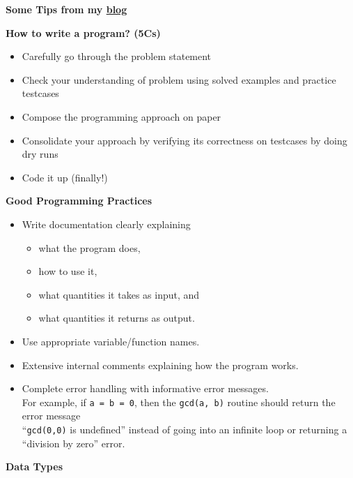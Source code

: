 \documentclass[../Problems]{subfiles}
\begin{document}
\begin{center}
	\textbf{\Large{Some Tips} from my \href{https://paramrathour.github.io/blog/cs101-tips}{blog}}
\end{center}
\begin{center}
	\textbf{\large{How to write a program? (5Cs)}}
\end{center}
\begin{itemize}
\item Carefully go through the problem statement
\item Check your understanding of problem using solved examples and practice testcases
\item Compose the programming approach on paper
\item Consolidate your approach by verifying its correctness on testcases by doing dry runs
\item Code it up (finally!)
\end{itemize}
\begin{center}
	\textbf{\large{Good Programming Practices}}
\end{center}
\begin{itemize}
\item 
Write documentation clearly explaining 
	\begin{itemize}
	\item what the program does,
	\item how to use it,
	\item what quantities it takes as input, and
	\item what quantities it returns as output.
	\end{itemize}
\item
Use appropriate variable/function names.
\item 
Extensive internal comments explaining how the program works.
\item 
Complete error handling with informative error messages.\\
For example, if \verb!a = b = 0!, then the \verb!gcd(a, b)! routine should return the error message \\``\verb!gcd(0,0)! is undefined'' instead of going into an infinite loop or returning a ``division by zero'' error.
\end{itemize}
\begin{center}
	\textbf{\large{Data Types}}
\end{center}
\end{document}
